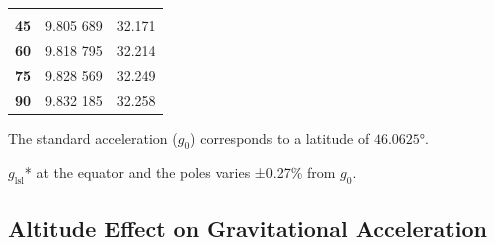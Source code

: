 \documentclass[
]{book}
\begin{document}
\begin{longtable}[]{@{}lll@{}}
\begin{minipage}[t]{0.25\columnwidth}
\end{minipage}\tabularnewline
\begin{minipage}[t]{0.18\columnwidth}\raggedright
\textbf{45}\strut
\end{minipage} & \begin{minipage}[t]{0.30\columnwidth}\raggedright
9.805 689\strut
\end{minipage} & \begin{minipage}[t]{0.25\columnwidth}\raggedright
32.171\strut
\end{minipage}\tabularnewline
\begin{minipage}[t]{0.18\columnwidth}\raggedright
\textbf{60}\strut
\end{minipage} & \begin{minipage}[t]{0.30\columnwidth}\raggedright
9.818 795\strut
\end{minipage} & \begin{minipage}[t]{0.25\columnwidth}\raggedright
32.214\strut
\end{minipage}\tabularnewline
\begin{minipage}[t]{0.18\columnwidth}\raggedright
\textbf{75}\strut
\end{minipage} & \begin{minipage}[t]{0.30\columnwidth}\raggedright
9.828 569\strut
\end{minipage} & \begin{minipage}[t]{0.25\columnwidth}\raggedright
32.249\strut
\end{minipage}\tabularnewline
\begin{minipage}[t]{0.18\columnwidth}\raggedright
\textbf{90}\strut
\end{minipage} & \begin{minipage}[t]{0.30\columnwidth}\raggedright
9.832 185\strut
\end{minipage} & \begin{minipage}[t]{0.25\columnwidth}\raggedright
32.258\strut
\end{minipage}\tabularnewline
\bottomrule
\end{longtable}

The standard acceleration (\(g_0\)) corresponds to a latitude of \(46.0625°\).

\(g_{\mathrm{lsl}}\)* at the equator and the poles varies ±0.27\% from \(g_0\).

\hypertarget{altitude-effect-on-gravitational-acceleration}{%
\subsection*{Altitude Effect on Gravitational Acceleration}\label{altitude-effect-on-gravitational-acceleration}}
\end{document}

